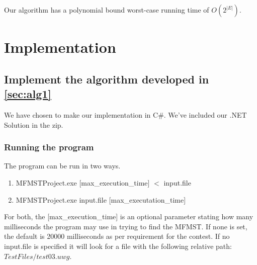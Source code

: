 \documentclass[12pt]{report}
\begin{document}
Our algorithm has a polynomial bound worst-case running time of $O(2^{|E|})$.

\chapter{Implementation}
\section{Implement the algorithm developed in \ref{sec:alg1}}
We have chosen to make our implementation in C\#. We've included our .NET Solution in the zip.
\subsection{Running the program}
The program can be run in two ways.
\begin{enumerate}
	\item MFMSTProject.exe [max\_execution\_time] $<$ input.file
	\item MFMSTProject.exe input.file [max\_executation\_time]
\end{enumerate}

For both, the [max\_execution\_time] is an optional parameter stating how many milliseconds the program may use in trying to find the MFMST. If none is set, the default is 20000 milliseconds as per requirement for the contest. If no input.file is specified it will look for a file with the following relative path: $TestFiles/test03.uwg$.
\end{document}
